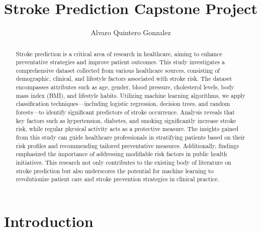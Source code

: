 \documentclass[runningheads]{llncs}
\begin{document}
%
\title{Stroke Prediction Capstone Project}
%
%
\author{Alvaro Quintero Gonzalez}
%
%
%
\maketitle              %
%
\begin{abstract}
Stroke prediction is a critical area of research in healthcare, aiming to enhance preventative strategies and improve patient outcomes. This study investigates a comprehensive dataset collected from various healthcare sources, consisting of demographic, clinical, and lifestyle factors associated with stroke risk. The dataset encompasses attributes such as age, gender, blood pressure, cholesterol levels, body mass index (BMI), and lifestyle habits. Utilizing machine learning algorithms, we apply classification techniques—including logistic regression, decision trees, and random forests—to identify significant predictors of stroke occurrence. Analysis reveals that key factors such as hypertension, diabetes, and smoking significantly increase stroke risk, while regular physical activity acts as a protective measure. The insights gained from this study can guide healthcare professionals in stratifying patients based on their risk profiles and recommending tailored preventative measures. Additionally, findings emphasized the importance of addressing modifiable risk factors in public health initiatives. This research not only contributes to the existing body of literature on stroke prediction but also underscores the potential for machine learning to revolutionize patient care and stroke prevention strategies in clinical practice. 

\end{abstract}
%
%
%
\section{Introduction}
\end{document}
